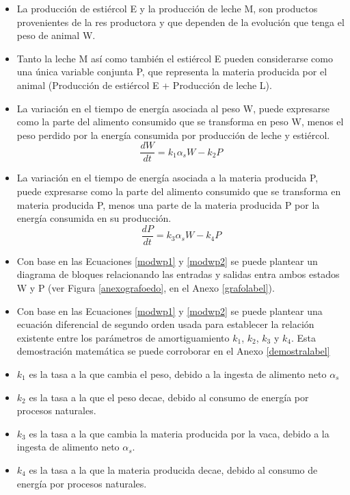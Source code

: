 \begin{itemize}

    \item La producción de estiércol E y la producción de leche M, son productos provenientes de la res productora y que dependen de la evolución que tenga el peso de animal W.

    \item Tanto la leche M así como también el estiércol E pueden considerarse como una única variable conjunta P, que representa la materia producida por el animal (Producción de estiércol E + Producción de leche L).

    \item La variación en el tiempo de energía asociada al peso W, puede expresarse como la parte del alimento consumido que se transforma en peso W, menos el peso perdido por la energía consumida por producción de leche y estiércol.
    \begin{equation} \label{modwp1}
        \frac{dW}{dt} = k_{1}\alpha_{s}W - k_{2}P
    \end{equation}

    \item La variación en el tiempo de energía asociada a la materia producida P, puede expresarse como la parte del alimento consumido que se transforma en materia producida P, menos una parte de la materia producida P por la energía consumida en su producción.
    \begin{equation}\label{modwp2}
        \frac{dP}{dt} = k_{3}\alpha_{s}W - k_{4}P
    \end{equation}
    \item Con base en las Ecuaciones \ref{modwp1} y \ref{modwp2} se puede plantear un diagrama de bloques relacionando las entradas y salidas entra ambos estados W y P (ver Figura \ref{anexografoedo}, en el Anexo \ref{grafolabel}).
    \item Con base en las Ecuaciones \ref{modwp1} y \ref{modwp2} se puede plantear una ecuación diferencial de segundo orden usada para establecer la relación existente entre los parámetros de amortiguamiento $k_{1}$, $k_{2}$, $k_{3}$ y $k_{4}$. Esta demostración matemática se puede corroborar en el Anexo \ref{demostralabel}
    \item $k_{1}$ es la tasa a la que cambia el peso, debido a la ingesta de alimento neto $\alpha_{s}$
    \item $k_{2}$ es la tasa a la que el peso decae, debido al consumo de energía por procesos naturales.
    \item $k_{3}$ es la tasa a la que cambia la materia producida por la vaca, debido a la ingesta de alimento neto $\alpha_{s}$.
    \item $k_{4}$ es la tasa a la que la materia producida decae, debido al consumo de energía por procesos naturales.
\end{itemize}

